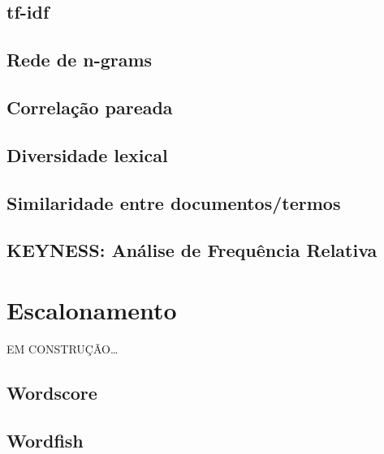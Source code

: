 \documentclass[]{book}
\begin{document}
\hypertarget{tf-idf}{%
\section{tf-idf}\label{tf-idf}}

\hypertarget{rede-de-n-grams}{%
\section{Rede de n-grams}\label{rede-de-n-grams}}

\hypertarget{correlauxe7uxe3o-pareada}{%
\section{Correlação pareada}\label{correlauxe7uxe3o-pareada}}

\hypertarget{diversidade-lexical}{%
\section{Diversidade lexical}\label{diversidade-lexical}}

\hypertarget{similaridade-entre-documentostermos}{%
\section{Similaridade entre documentos/termos}\label{similaridade-entre-documentostermos}}

\hypertarget{keyness-anuxe1lise-de-frequuxeancia-relativa}{%
\section{KEYNESS: Análise de Frequência Relativa}\label{keyness-anuxe1lise-de-frequuxeancia-relativa}}

\hypertarget{scalling}{%
\chapter{Escalonamento}\label{scalling}}

EM CONSTRUÇÃO\ldots{}

\hypertarget{wordscore}{%
\section{Wordscore}\label{wordscore}}

\hypertarget{wordfish}{%
\section{Wordfish}\label{wordfish}}
\end{document}
